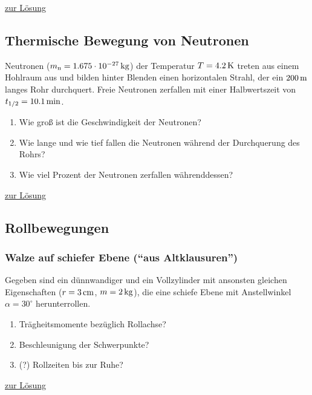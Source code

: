 \documentclass[a4paper]{scrartcl}
\begin{document}
\hyperref[lsg:Strahlungsdruck]{zur Lösung}


\subsection{Thermische Bewegung von Neutronen}
\label{aufg:ThermischeNeutronen}

Neutronen ($m_\text{n} = \unit[1.675 \cdot 10^{-27}]{kg}$) der Temperatur $T= \unit[4.2]{K}$ treten aus einem Hohlraum aus und bilden hinter Blenden einen horizontalen Strahl, der ein $\unit[200]{m}$ langes Rohr durchquert. Freie Neutronen zerfallen mit einer Halbwertszeit von $t_{1/2} = \unit[10.1]{min}$.
\begin{enumerate}[noitemsep]
  \item Wie groß ist die Geschwindigkeit der Neutronen?
  \item Wie lange und wie tief fallen die Neutronen während der Durchquerung des Rohrs?
  \item Wie viel Prozent der Neutronen zerfallen währenddessen?
\end{enumerate}

\hyperref[lsg:ThermischeNeutronen]{zur Lösung}


\subsection{Rollbewegungen}
\subsubsection{Walze auf schiefer Ebene ("`aus Altklausuren"')}
\label{aufg:WalzeSchiefeEbene}
Gegeben sind ein dünnwandiger und ein Vollzylinder mit ansonsten gleichen Eigenschaften ($r = \unit[3]{cm}$, $m = \unit[2]{kg}$), die eine schiefe Ebene mit Anstellwinkel $\alpha = 30^\circ$ herunterrollen.
\begin{enumerate}[noitemsep]
  \item Trägheitsmomente bezüglich Rollachse?
  \item Beschleunigung der Schwerpunkte?
  \item (?) Rollzeiten bis zur Ruhe?
\end{enumerate}

\hyperref[lsg:WalzeSchiefeEbene]{zur Lösung}
\end{document}
